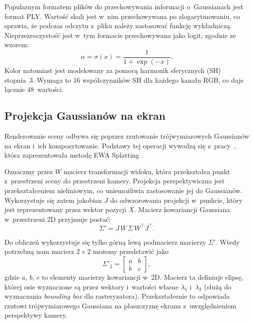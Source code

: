 Popularnym formatem plików do przechowywania informacji o~Gaussianach jest
format PLY. Wartość skali jest w~nim przechowywana po zlogarytmowaniu, co
sprawia, że podczas odczytu z~pliku należy zastosować funkcję wykładniczą.
Nieprzezroczystość jest w~tym formacie przechowywana jako logit, zgodnie ze
wzorem:
\begin{equation}
  \alpha = \sigma(x) = \frac{1}{1 + \exp(-x)}.
  \label{eq:sigmoid}
\end{equation}
Kolor natomiast jest modelowany za pomocą harmonik sferycznych (SH) stopnia~3.
Wymaga to 16 współczynników SH dla każdego kanału RGB, co daje łącznie
48~wartości.

\subsection{Projekcja Gaussianów na ekran}
\label{subsec:projekcja}

Renderowanie sceny odbywa się poprzez rzutowanie trójwymiarowych Gaussianów
na ekran i~ich kompozytowanie. Podstawy tej operacji wywodzą się
z~pracy~\cite{zwicker2002ewa}, która zaprezentowała metodę EWA Splatting
.

Oznaczmy przez $W$ macierz transformacji widoku, która przekształca punkt
z~przestrzeni sceny do przestrzeni kamery. Projekcja perspektywiczna jest
przekształceniem nieliniowym, co uniemożliwia zastosowanie jej do Gaussianów.
Wykorzystuje się zatem jakobian $J$ do odwzorowania projekcji w~punkcie, który
jest reprezentowany przez wektor pozycji $X$. Macierz kowariancji Gaussiana
w~przestrzeni 2D przyjmuje postać:
\begin{equation}
  \Sigma' = J\,W\,\Sigma\,W^{\top} J^{\top}.
  \label{eq:kowariancja2d}
\end{equation}

Do obliczeń wykorzystuje się tylko górną lewą podmacierz macierzy $\Sigma'$.
Wtedy potrzebną nam macierz $2 \times 2$ możemy przedstawić jako
\begin{equation}
  \Sigma'_2 =
  \begin{bmatrix}
    a & b \\
    b & c
  \end{bmatrix},
  \label{eq:kowariancja2x2}
\end{equation}
gdzie $a$, $b$, $c$ to elementy macierzy kowariancji w~2D. Macierz ta
definiuje elipsę, której osie wyznaczone są przez wektory i~wartości własne
$\lambda_1$ i~$\lambda_2$ (służą do wyznaczania \textit{bounding box} dla
rasteryzatora). Przekształcenie to odpowiada rzutowi trójwymiarowego Gaussiana
na płaszczyznę ekranu z~uwzględnieniem perspektywy kamery.

